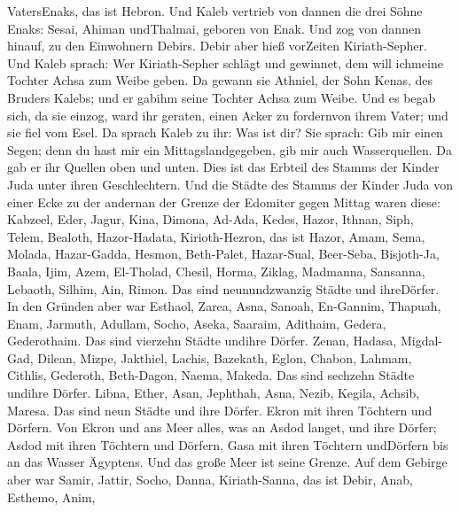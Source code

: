 VatersEnaks, das ist Hebron.  Und Kaleb vertrieb von dannen
die drei Söhne Enaks: Sesai, Ahiman undThalmai, geboren von Enak.
 Und zog von dannen hinauf, zu den Einwohnern Debirs. Debir
aber hieß vorZeiten Kiriath-Sepher.  Und Kaleb sprach: Wer
Kiriath-Sepher schlägt und gewinnet, dem will ichmeine Tochter Achsa zum
Weibe geben.  Da gewann sie Athniel, der Sohn Kenas, des
Bruders Kalebs; und er gabihm seine Tochter Achsa zum Weibe.
 Und es begab sich, da sie einzog, ward ihr geraten, einen
Acker zu fordernvon ihrem Vater; und sie fiel vom Esel. Da sprach Kaleb
zu ihr: Was ist dir?  Sie sprach: Gib mir einen Segen; denn
du hast mir ein Mittagslandgegeben, gib mir auch Wasserquellen. Da gab
er ihr Quellen oben und unten.  Dies ist das Erbteil des
Stamms der Kinder Juda unter ihren Geschlechtern.  Und die
Städte des Stamms der Kinder Juda von einer Ecke zu der andernan der
Grenze der Edomiter gegen Mittag waren diese: Kabzeel, Eder, Jagur,
 Kina, Dimona, Ad-Ada,  Kedes, Hazor, Ithnan,
 Siph, Telem, Bealoth,  Hazor-Hadata,
Kirioth-Hezron, das ist Hazor,  Amam, Sema, Molada,
 Hazar-Gadda, Hesmon, Beth-Palet,  Hazar-Sual,
Beer-Seba, Bisjoth-Ja,  Baala, Ijim, Azem, 
El-Tholad, Chesil, Horma,  Ziklag, Madmanna, Sansanna,
 Lebaoth, Silhim, Ain, Rimon. Das sind neunundzwanzig
Städte und ihreDörfer.  In den Gründen aber war Esthaol,
Zarea, Asna,  Sanoah, En-Gannim, Thapuah, Enam,
 Jarmuth, Adullam, Socho, Aseka,  Saaraim,
Adithaim, Gedera, Gederothaim. Das sind vierzehn Städte undihre Dörfer.
 Zenan, Hadasa, Migdal-Gad,  Dilean, Mizpe,
Jakthiel,  Lachis, Bazekath, Eglon,  Chabon,
Lahmam, Cithlis,  Gederoth, Beth-Dagon, Naema, Makeda. Das
sind sechzehn Städte undihre Dörfer.  Libna, Ether, Asan,
 Jephthah, Asna, Nezib,  Kegila, Achsib,
Maresa. Das sind neun Städte und ihre Dörfer.  Ekron mit
ihren Töchtern und Dörfern.  Von Ekron und ans Meer alles,
was an Asdod langet, und ihre Dörfer;  Asdod mit ihren
Töchtern und Dörfern, Gasa mit ihren Töchtern undDörfern bis an das
Wasser Ägyptens. Und das große Meer ist seine Grenze.  Auf
dem Gebirge aber war Samir, Jattir, Socho,  Danna,
Kiriath-Sanna, das ist Debir,  Anab, Esthemo, Anim,
